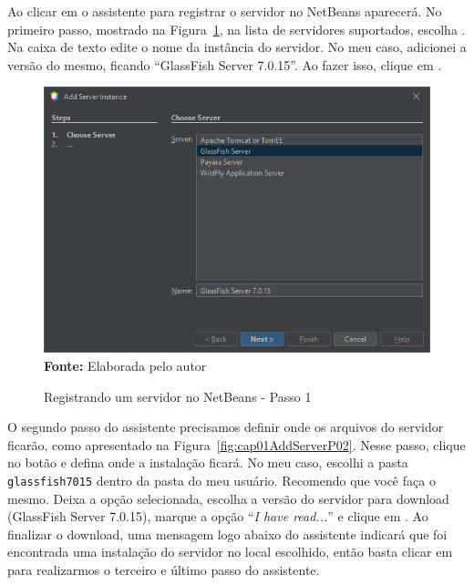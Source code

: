 Ao clicar em  o assistente para registrar o servidor no NetBeans aparecerá. No primeiro passo, mostrado na Figura~\ref{fig:cap01AddServerP01}, na lista de servidores suportados, escolha . Na caixa de texto  edite o nome da instância do servidor. No meu caso, adicionei a versão do mesmo, ficando ``GlassFish Server 7.0.15''. Ao fazer isso, clique em .

\FloatBarrier
\begin{figure}[!htbp]
    \centering
    \caption{Registrando um servidor no NetBeans - Passo 1}
    \includegraphics[scale=0.7]{imagens/cap01AddServerInstanceP01}
    \\\textbf{Fonte:} Elaborada pelo autor
    \label{fig:cap01AddServerP01}
\end{figure}
\FloatBarrier

O segundo passo do assistente precisamos definir onde os arquivos do servidor ficarão, como apresentado na Figura~\ref{fig:cap01AddServerP02}. Nesse passo, clique no botão  e defina onde a instalação ficará. No meu caso, escolhi a pasta \texttt{glassfish7015} dentro da pasta do meu usuário. Recomendo que você faça o mesmo. Deixa a opção  selecionada, escolha a versão do servidor para download (GlassFish Server 7.0.15), marque a opção ``\textit{I have read...}'' e clique em . Ao finalizar o download, uma mensagem logo abaixo do assistente indicará que foi encontrada uma instalação do servidor no local escolhido, então basta clicar em  para realizarmos o terceiro e último passo do assistente.


